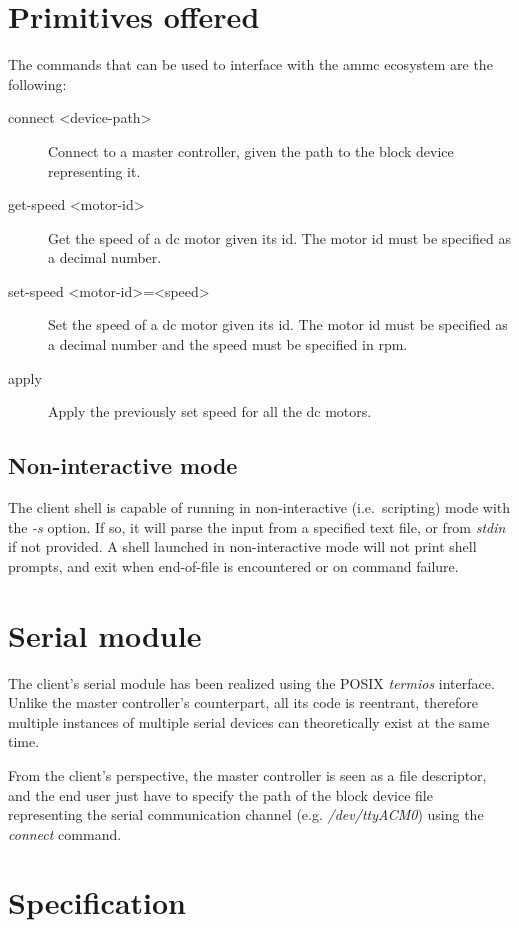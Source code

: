 \documentclass[binding=0.6cm,Lau]{sapthesis}
\begin{document}
\section{Primitives offered}
The commands that can be used to interface with the ammc ecosystem are the
following:
\begin{description}
  \item[connect <device-path>] Connect to a master controller, given the path
    to the block device representing it.
  \item[get-speed <motor-id>] Get the speed of a dc motor given its id.
    The motor id must be specified as a decimal number.
  \item[set-speed <motor-id>=<speed>] Set the speed of a dc motor given its id.
    The motor id must be specified as a decimal number and the speed must be
    specified in rpm.
  \item[apply] Apply the previously set speed for all the dc motors.
\end{description}

\subsection{Non-interactive mode}
The client shell is capable of running in non-interactive (i.e.\ scripting)
mode with the \emph{-s} option.  If so, it will parse the input from a
specified text file, or from \emph{stdin} if not provided.  A shell launched in
non-interactive mode will not print shell prompts, and exit when end-of-file is
encountered or on command failure.

\section{Serial module}
The client's serial module has been realized using the POSIX \emph{termios}
interface. Unlike the master controller's counterpart, all its code is
reentrant, therefore multiple instances of multiple serial devices can
theoretically exist at the same time.

From the client's perspective, the master controller is seen as a file
descriptor, and the end user just have to specify the path of the block device
file representing the serial communication channel (e.g. \emph{/dev/ttyACM0})
using the \emph{connect} command.

\section{Specification}
\end{document}
